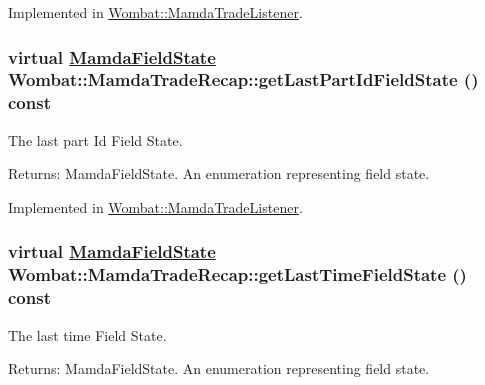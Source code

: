 Implemented in \hyperlink{classWombat_1_1MamdaTradeListener_049bea66cd1715f50a3f894137810b30}{Wombat::Mamda\-Trade\-Listener}.\hypertarget{classWombat_1_1MamdaTradeRecap_a2b712b3f95d4613d5a1c98c61b00902}{
\subsubsection[getLastPartIdFieldState]{\setlength{\rightskip}{0pt plus 5cm}virtual \hyperlink{namespaceWombat_93aac974f2ab713554fd12a1fa3b7d2a}{Mamda\-Field\-State} Wombat::Mamda\-Trade\-Recap::get\-Last\-Part\-Id\-Field\-State () const}}
\label{classWombat_1_1MamdaTradeRecap_a2b712b3f95d4613d5a1c98c61b00902}


The last part Id Field State. 

\begin{Desc}
\item[Returns:]Mamda\-Field\-State. An enumeration representing field state. \end{Desc}


Implemented in \hyperlink{classWombat_1_1MamdaTradeListener_7ecf8dab22bff20d0f5b909d81f67dcb}{Wombat::Mamda\-Trade\-Listener}.\hypertarget{classWombat_1_1MamdaTradeRecap_cb3823e27dc163ff09b61e8a41ff960f}{
\subsubsection[getLastTimeFieldState]{\setlength{\rightskip}{0pt plus 5cm}virtual \hyperlink{namespaceWombat_93aac974f2ab713554fd12a1fa3b7d2a}{Mamda\-Field\-State} Wombat::Mamda\-Trade\-Recap::get\-Last\-Time\-Field\-State () const}}
\label{classWombat_1_1MamdaTradeRecap_cb3823e27dc163ff09b61e8a41ff960f}


The last time Field State. 

\begin{Desc}
\item[Returns:]Mamda\-Field\-State. An enumeration representing field state. \end{Desc}


